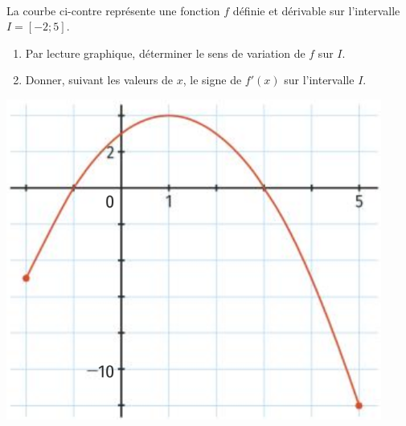 \documentclass[11pt]{article}
\begin{document}
\begin{exo}~\\
\begin{minipage}{.6\textwidth}
  La courbe ci-contre représente une fonction $f$ définie et dérivable sur
  l'intervalle $I=[-2;5]$.
  \begin{enumerate}
    \item Par lecture graphique, déterminer le sens de variation de $f$ sur $I$.
    \item Donner, suivant les valeurs de $x$, le signe de $f'(x)$ sur
      l'intervalle $I$.
  \end{enumerate}
\end{minipage}
\begin{minipage}{.4\textwidth}
  \begin{center}
    \includegraphics[scale=.25]{exo1.png}
  \end{center}
\end{minipage}
\end{exo}
\end{document}
